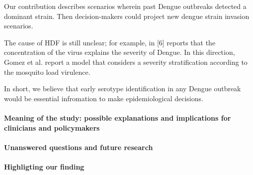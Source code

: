         Our contribution describes scenarios wherein past Dengue outbreaks
    detected a dominant strain. Then decision-makers could project new
    dengue strain invasion scenarios.

        The cause of HDF is still unclear; for example, in [6] reports that
    the concentration of the virus explains the severity of Dengue. In
    this direction, Gomez et al. report a model that considers a severity
    stratification according to the mosquito load virulence.

        In short, we believe that early serotype identification in any Dengue
    outbreak would be essential infromation to make epidemiological decisions.


    
    
    \paragraph{Meaning of the study: possible explanations 
    and implications for clinicians
    and policymakers}
    \paragraph{Unanswered questions and future research}

\paragraph{Highligting our finding}
